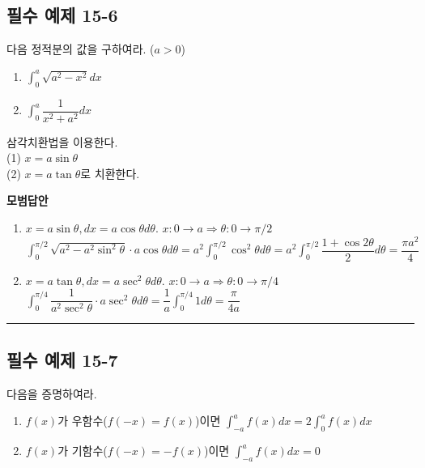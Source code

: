 \documentclass[a4paper,11pt]{article}
\begin{document}
\subsection*{필수 예제 15-6}
다음 정적분의 값을 구하여라. ($a>0$)
\begin{enumerate}[label=(\arabic*)]
    \item $\displaystyle\int_{0}^{a} \sqrt{a^2-x^2} dx$
    \item $\displaystyle\int_{0}^{a} \dfrac{1}{x^2+a^2} dx$
\end{enumerate}

\begin{studybox}
삼각치환법을 이용한다.\\
(1) $x = a \sin \theta$\\
(2) $x = a \tan \theta$로 치환한다.
\end{studybox}

\textbf{모범답안}
\begin{enumerate}[label=(\arabic*)]
    \item $x=a\sin\theta, dx=a\cos\theta d\theta$. $x: 0 \to a \Rightarrow \theta: 0 \to \pi/2$\\
    $\int_{0}^{\pi/2} \sqrt{a^2-a^2\sin^2\theta} \cdot a\cos\theta d\theta = a^2 \int_{0}^{\pi/2} \cos^2\theta d\theta = a^2 \int_{0}^{\pi/2} \dfrac{1+\cos 2\theta}{2} d\theta = \dfrac{\pi a^2}{4}$
    \item $x=a\tan\theta, dx=a\sec^2\theta d\theta$. $x: 0 \to a \Rightarrow \theta: 0 \to \pi/4$\\
    $\int_{0}^{\pi/4} \dfrac{1}{a^2\sec^2\theta} \cdot a\sec^2\theta d\theta = \dfrac{1}{a} \int_{0}^{\pi/4} 1 d\theta = \dfrac{\pi}{4a}$
\end{enumerate}

\vspace{0.5cm}
\hrule
\vspace{0.5cm}

\subsection*{필수 예제 15-7}
다음을 증명하여라.
\begin{enumerate}[label=(\arabic*)]
    \item $f(x)$가 우함수($f(-x)=f(x)$)이면 $\displaystyle\int_{-a}^{a} f(x) dx = 2\int_{0}^{a} f(x) dx$
    \item $f(x)$가 기함수($f(-x)=-f(x)$)이면 $\displaystyle\int_{-a}^{a} f(x) dx = 0$
\end{enumerate}
\end{document}
